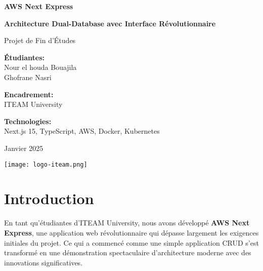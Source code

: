 \documentclass[12pt,a4paper]{report}
\begin{document}
\begin{titlepage}
    \centering
    \vspace*{2cm}
    
    {\huge\bfseries AWS Next Express\par}
    \vspace{0.5cm}
    {\large\bfseries Architecture Dual-Database avec Interface Révolutionnaire\par}
    \vspace{2cm}
    
    {\Large Projet de Fin d'Études\par}
    \vspace{1cm}
    
    {\large
    \textbf{Étudiantes:}\\
    Nour el houda Bouajila\\
    Ghofrane Nasri\par}
    \vspace{1cm}
    
    {\large
    \textbf{Encadrement:}\\
    ITEAM University\par}
    \vspace{2cm}
    
    {\large
    \textbf{Technologies:}\\
    Next.js 15, TypeScript, AWS, Docker, Kubernetes\par}
    \vspace{1cm}
    
    {\large Janvier 2025\par}
    
    \vfill
    
    \texttt{[image: logo-iteam.png]}
    
\end{titlepage}

\tableofcontents
\newpage

\chapter{Introduction}

En tant qu'étudiantes d'ITEAM University, nous avons développé \textbf{AWS Next Express}, une application web révolutionnaire qui dépasse largement les exigences initiales du projet. Ce qui a commencé comme une simple application CRUD s'est transformé en une démonstration spectaculaire d'architecture moderne avec des innovations significatives.
\end{document}
